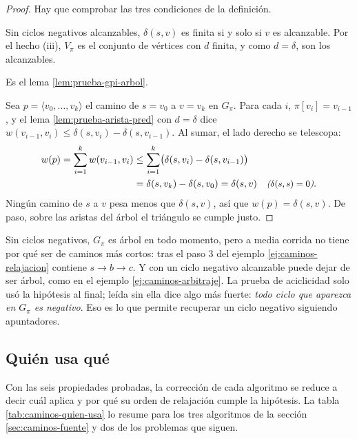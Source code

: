 \documentclass[11pt,letterpaper]{article}
\begin{document}
\begin{proof}
  Hay que comprobar las tres condiciones de la definición.

   Sin ciclos negativos
  alcanzables, $\delta(s, v)$ es finita si y solo si $v$ es alcanzable.
  Por el hecho (iii), $V_\pi$ es el conjunto de vértices con $d$
  finita, y como $d = \delta$, son los alcanzables.

   Es el lema
  \ref{lem:prueba-gpi-arbol}.

   Sea
  $p = \langle v_0, \dots, v_k \rangle$ el camino de $s = v_0$ a
  $v = v_k$ en $G_\pi$. Para cada $i$, $\pi[v_i] = v_{i-1}$, y el lema
  \ref{lem:prueba-arista-pred} con $d = \delta$ dice
  $w(v_{i-1}, v_i) \le \delta(s, v_i) - \delta(s, v_{i-1})$. Al sumar,
  el lado derecho se telescopa:
  \begin{align*}
    w(p) = \sum_{i=1}^{k} w(v_{i-1}, v_i)
      &\le \sum_{i=1}^{k}
           \bigl( \delta(s, v_i) - \delta(s, v_{i-1}) \bigr) \\
      &= \delta(s, v_k) - \delta(s, v_0)
       = \delta(s, v) \quad\text{\small\itshape ($\delta(s, s) = 0$)} .
  \end{align*}
  Ningún camino de $s$ a $v$ pesa menos que $\delta(s, v)$, así que
  $w(p) = \delta(s, v)$. De paso, sobre las aristas del árbol el
  triángulo se cumple justo.
\end{proof}

\begin{ojo}
  Sin ciclos negativos, $G_\pi$ es árbol en todo momento, pero a media
  corrida no tiene por qué ser de caminos más cortos: tras el paso 3
  del ejemplo \ref{ej:caminos-relajacion} contiene $s \to b \to c$. Y
  con un ciclo negativo alcanzable puede dejar de ser árbol, como en
  el ejemplo \ref{ej:caminos-arbitraje}. La prueba de aciclicidad solo
  usó la hipótesis al final; leída sin ella dice algo más fuerte:
  \emph{todo ciclo que aparezca en $G_\pi$ es negativo}. Eso es lo que
  permite recuperar un ciclo negativo siguiendo apuntadores.
\end{ojo}


\subsection*{Quién usa qué}

Con las seis propiedades probadas, la corrección de cada algoritmo se
reduce a decir cuál aplica y por qué su orden de relajación cumple la
hipótesis. La tabla \ref{tab:caminos-quien-usa} lo resume para los
tres algoritmos de la sección \ref{sec:caminos-fuente} y dos de los
problemas que siguen.
\end{document}
